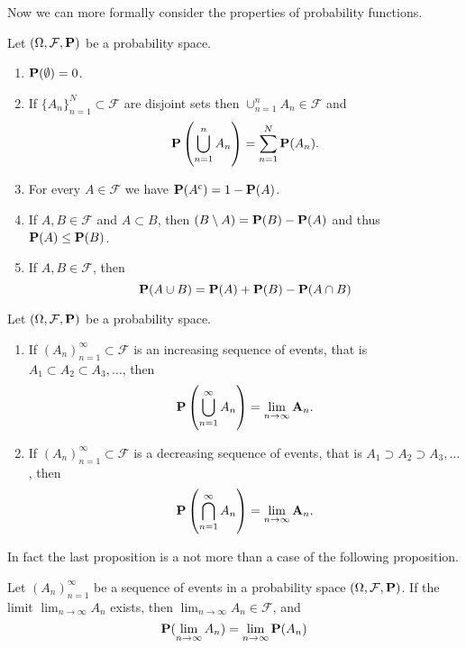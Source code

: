 \documentclass[11pt,a4paper]{article}
\begin{document}
  Now we can more formally consider the properties of probability functions.
  \begin{proposition}
    Let $(\Omega, \mathcal F, \mathbf{P})$ be a probability space.
    \begin{enumerate}
      \item $\mathbf{P}(\emptyset) = 0$.
      \item If $\{A_n\}_{n=1}^{N} \subset \mathcal F$ are disjoint sets then
        $\cup_{n=1}^{n}{A_n} \in \mathcal F$ and
        \[
          \mathbf{P}\left(\bigcup_{n=1}^{n}{A_n}\right) = 
          \sum_{n=1}^{N}{\mathbf{P}(A_n)}.
        \]
      \item For every $A \in \mathcal F$ we have 
        $\mathbf{P}(A^c) = 1 - \mathbf{P}(A)$.
      \item If $A, B \in \mathcal F$ and $A \subset B$, then 
        $\mathbf(B \setminus A) = \mathbf{P}(B) - \mathbf{P}(A)$ and thus
        $\mathbf{P}(A) \le \mathbf{P}(B)$.
      \item If $A,B \in \mathcal F$, then
        \[
          \mathbf{P}(A \cup B) = 
          \mathbf{P}(A) + \mathbf{P}(B) - \mathbf{P}(A \cap B)
        \]
    \end{enumerate}
  \end{proposition}
  
  \begin{theorem}
    \label{thm:continuity-base}
    Let $(\Omega, \mathcal F, \mathbf{P})$ be a probability space.
    \begin{enumerate}
      \item If $(A_n)_{n=1}^{\infty} \subset \mathcal F$ is an increasing
        sequence of events, that is $A_1 \subset A_2 \subset A_3, \dots$,
        then
        \[
          \mathbf{P}\left(\bigcup_{n=1}^{\infty}{A_n}\right) = 
          \lim_{n \to \infty}{\mathbf A_n}.
        \]
      \item If $(A_n)_{n=1}^{\infty} \subset \mathcal F$ is a decreasing
        sequence of events, that is $A_1 \supset A_2 \supset A_3, \dots$,
        then
        \[
          \mathbf{P}\left(\bigcap_{n=1}^{\infty}{A_n}\right) = 
          \lim_{n \to \infty}{\mathbf A_n}.
        \]
    \end{enumerate}
  \end{theorem}

  In fact the last proposition is a not more than a case of the following
  proposition.

  \begin{proposition}
    Let $(A_n)_{n=1}^{\infty}$ be a sequence of events in a probability space
    $(\Omega, \mathcal F, \mathbf{P})$. If the limit $\lim_{n \to \infty} A_n$
    exists, then $\lim_{n \to \infty} A_n \in \mathcal F$, and
    \[
      \mathbf{P}(\lim_{n \to \infty}{A_n}) = 
      \lim_{n \to \infty} \mathbf{P}(A_n)
    \]
  \end{proposition}
  
\end{document}
